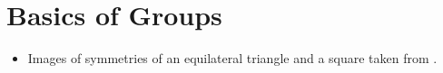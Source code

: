 \section{Basics of Groups}
\begin{itemize}
    \item Images of symmetries of an equilateral triangle and a square taken from \cite[p. 13]{milne_2021}.
\end{itemize}

\printbibliography[heading=bibintoc, title={References and Bibliography}]
\printindex


